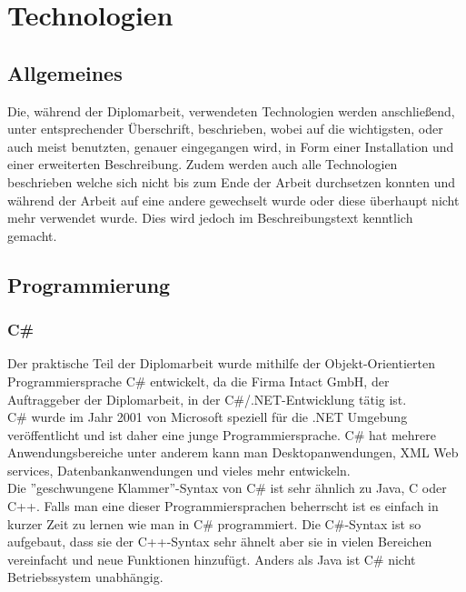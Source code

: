 \renewcommand{\theauthor}{Dario Wagner}
\chapter{Technologien}
\label{sec:Technologien}
\section{Allgemeines}
\label{sec:TechnologieAllgemeines}
Die, während der Diplomarbeit, verwendeten Technologien werden anschließend, unter entsprechender Überschrift, beschrieben, wobei auf die wichtigsten, oder auch meist benutzten, genauer eingegangen wird, in Form einer Installation und einer erweiterten Beschreibung. Zudem werden auch alle Technologien beschrieben welche sich nicht bis zum Ende der Arbeit durchsetzen konnten und während der Arbeit auf eine andere gewechselt wurde oder diese überhaupt nicht mehr verwendet wurde. Dies wird jedoch im Beschreibungstext kenntlich gemacht.
\section{Programmierung}
\label{sec:TechnologieProgrammierung}
\subsection{C\#}
\label{sec:CSharp}
Der praktische Teil der Diplomarbeit wurde mithilfe der Objekt-Orientierten Programmiersprache C\# entwickelt, da die Firma Intact GmbH, der Auftraggeber der Diplomarbeit, in der C\#/.NET-Entwicklung tätig ist. \\ \break
C\# wurde im Jahr 2001 von Microsoft speziell für die .NET Umgebung veröffentlicht und ist daher eine junge Programmiersprache. C\# hat mehrere Anwendungsbereiche unter anderem kann man Desktopanwendungen, XML Web services, Datenbankanwendungen und vieles mehr entwickeln. \\ \break
Die ''geschwungene Klammer''-Syntax von C\# ist sehr ähnlich zu Java, C oder C++. Falls man eine dieser Programmiersprachen beherrscht ist es einfach in kurzer Zeit zu lernen wie man in C\# programmiert. Die C\#-Syntax ist so aufgebaut, dass sie der C++-Syntax sehr ähnelt aber sie in vielen Bereichen vereinfacht und neue Funktionen hinzufügt. Anders als Java ist C\# nicht Betriebssystem unabhängig.
\cite{TechnologieCSharpErklaerung} 
